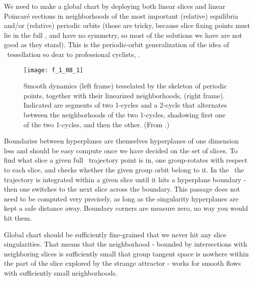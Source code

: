 We need to make a global chart by deploying both linear slices and linear
Poincar\'e sections in neighborhoods of the most important (relative)
equilibria and/or (relative) periodic orbits (those are tricky, because
slice fixing points must lie in the full \statesp, and have no symmetry,
so most of the solutions we have are not good as they stand). This is the
periodic-orbit generalization of the idea of
{\statesp\ tessellation}
so dear to professional cyclists, .

 \begin{figure}
 \texttt{[image: f\_1\_08\_1]}
 \caption{\label{fig:Tesselate}
Smooth dynamics  (left frame) tesselated by the skeleton of
periodic points, together with their linearized neighborhoods,
(right frame).
Indicated are segments of two 1-cycles and a 2-cycle that
alternates between the neighborhoods of the two 1-cycles,
shadowing first one of the two 1-cycles, and then the other.
(From \wwwcb{}.)
  }\end{figure}
%


Boundaries
between hyperplanes are themselves hyperplanes of one dimension less and
should be easy compute once we have decided on the set of slices. To find
what slice a given full \statesp\ trajectory point is in, one group-rotates
with respect to each slice, and checks whether the given group orbit
belong to it. In the \reducedsp\ the trajectory is integrated within a
given slice until it hits a hyperplane boundary - then one switches to
the next slice across the boundary. This passage does not need to
be computed very precisely, as long as the singularity
hyperplanes are kept a safe distance away. Boundary corners are measure zero, no
way you would hit them.

Global chart should be sufficiently fine-grained that we never hit any
slice singularities. That means that the neighborhood - bounded by
intersections with neighboring slices is sufficiently small that group
tangent space is nowhere within the part of the slice explored by
the strange attractor - works for smooth flows
with sufficiently small neighborhoods.


%
